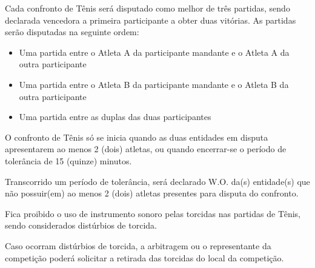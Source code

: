 \noindent
Cada confronto de Tênis será disputado como melhor de três partidas, sendo declarada vencedora a primeira participante a obter duas vitórias. As partidas serão disputadas na seguinte ordem:
\begin{itemize}[noitemsep]
	\item Uma partida entre o Atleta A da participante mandante e o Atleta A da outra participante
	\item Uma partida entre o Atleta B da participante mandante e o Atleta B da outra participante
	\item Uma partida entre as duplas das duas participantes
\end{itemize}

\begin{article}
	O confronto de Tênis só se inicia quando as duas entidades em disputa apresentarem ao menos 2 (dois) atletas, ou quando encerrar-se o período de tolerância de 15 (quinze) minutos.

	\begin{xparagraph}
		Transcorrido um período de tolerância, será declarado W.O. da(s) entidade(s) que não possuir(em) ao menos 2 (dois) atletas presentes para disputa do confronto.
	\end{xparagraph}
\end{article}

\begin{article}
	Fica proibido o uso de instrumento sonoro pelas torcidas nas partidas de Tênis, sendo considerados distúrbios de torcida.

	\begin{xparagraph}
		Caso ocorram distúrbios de torcida, a arbitragem ou o representante da competição poderá solicitar a retirada das torcidas do local da competição.
	\end{xparagraph}
\end{article}
